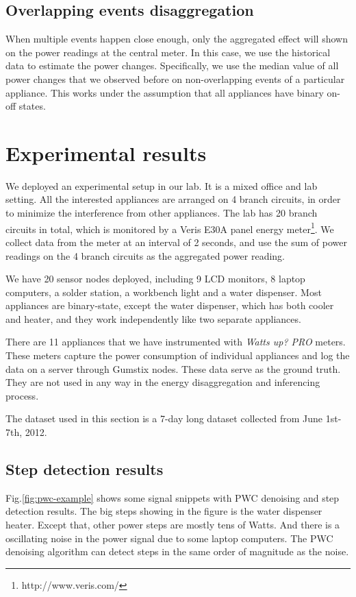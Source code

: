 \subsection{Overlapping events disaggregation}

When multiple events happen close enough, only the aggregated effect will shown on the power readings at the central meter. In this case, we use the historical data to estimate the power changes. Specifically, we use the median value of all power changes that we observed before on non-overlapping events of a particular appliance. This works under the assumption that all appliances have binary on-off states.

\section{Experimental results}

We deployed an experimental setup in our lab. It is a mixed office and lab setting. All the interested appliances are arranged on 4 branch circuits, in order to minimize the interference from other appliances. The lab has 20 branch circuits in total, which is monitored by a Veris E30A panel energy meter\footnote{http://www.veris.com/}. We collect data from the meter at an interval of 2 seconds, and use the sum of power readings on the 4 branch circuits as the aggregated power reading.

We have 20 sensor nodes deployed, including 9 LCD monitors, 8 laptop computers, a solder station, a workbench light and a water dispenser. Most appliances are binary-state, except the water dispenser, which has both cooler and heater, and they work independently like two separate appliances. 

There are 11 appliances that we have instrumented with \textit{Watts up? PRO} meters. These meters capture the power consumption of individual appliances and log the data on a server through Gumstix nodes. These data serve as the ground truth. They are not used in any way in the energy disaggregation and inferencing process. 

The dataset used in this section is a 7-day long dataset collected from June 1st-7th, 2012. 

\subsection{Step detection results}

Fig.\ref{fig:pwc-example} shows some signal snippets with PWC denoising and step detection results. The big steps showing in the figure is the water dispenser heater. Except that, other power steps are mostly tens of Watts. And there is a oscillating noise in the power signal due to some laptop computers. The PWC denoising algorithm can detect steps in the same order of magnitude as the noise. 

